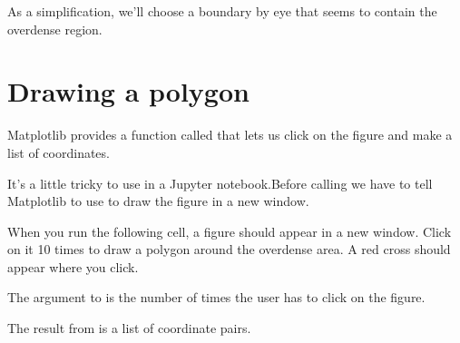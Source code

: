 \documentclass[letterpaper,10pt,english]{sphinxmanual}
\begin{document}
As a simplification, we’ll choose a boundary by eye that seems to contain the overdense region.


\section{Drawing a polygon}
\label{\detokenize{06_photo:drawing-a-polygon}}
Matplotlib provides a function called  that lets us click on the figure and make a list of coordinates.

It’s a little tricky to use  in a Jupyter notebook.Before calling  we have to tell Matplotlib to use  to draw the figure in a new window.

When you run the following cell, a figure should appear in a new window.  Click on it 10 times to draw a polygon around the overdense area.  A red cross should appear where you click.

\begin{sphinxVerbatim}[commandchars=\\\{\}]
   

 
      
      
\end{sphinxVerbatim}

The argument to  is the number of times the user has to click on the figure.

The result from  is a list of coordinate pairs.

\begin{sphinxVerbatim}[commandchars=\\\{\}]
\end{sphinxVerbatim}

\begin{sphinxVerbatim}[commandchars=\\\{\}]
[(0.2150537634408602, 17.548197203826344),
 (0.3897849462365591, 18.94628403237675),
 (0.5376344086021505, 19.902869757174393),
 (0.7034050179211468, 20.601913171449596),
 (0.8288530465949819, 21.300956585724798),
 (0.6630824372759856, 21.52170713760118),
 (0.4301075268817204, 20.785871964679913),
 (0.27329749103942647, 19.71891096394408),
 (0.17473118279569888, 18.688741721854306),
 (0.17473118279569888, 17.95290654893304)]
\end{sphinxVerbatim}
\end{document}

